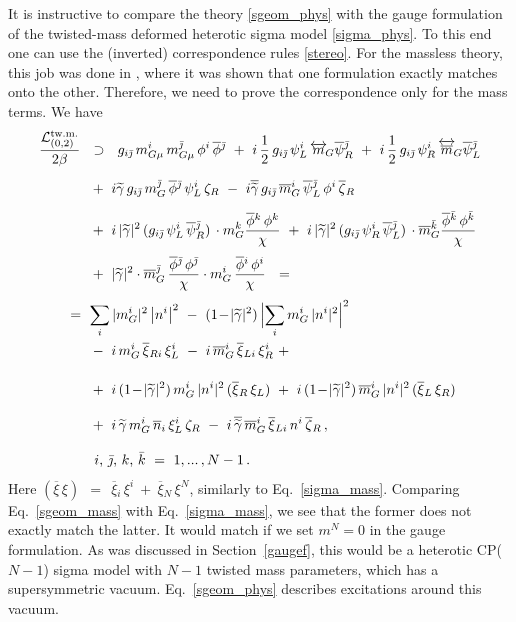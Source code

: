 \documentclass[12pt]{article}
\newcommand{\wt}{\widetilde}
\newcommand{\ov}{\overline}
\newcommand{\mc}[1]{\mathcal{#1}}
\newcommand{\bxir}{\ov{\xi}{}_R}
\newcommand{\bxil}{\ov{\xi}{}_L}
\newcommand{\xir}{\xi_R}
\newcommand{\xil}{\xi_L}
\newcommand{\bzr}{\ov{\zeta}{}_R}
\newcommand{\zr}{\zeta_R}
\newcommand{\tgamma}{\wt{\gamma}}
\newcommand{\btgamma}{\ov{\tgamma}}
\newcommand{\bpsi}{\ov{\psi}{}}
\newcommand{\bphi}{\ov{\phi}{}}
\newcommand{\bxi}{\ov{\xi}{}}
\newcommand{\bj}{{\bar \jmath}}
\newcommand{\bk}{{\bar k}}
\begin{document}
	It is instructive to compare the theory \eqref{sgeom_phys} with the gauge formulation of  the
	twisted-mass deformed heterotic sigma
	model  \eqref{sigma_phys}. To this end one
can use the (inverted) correspondence rules \eqref{stereo}. 
	For the massless theory, this job was done in \cite{BSYhet}, where it was shown that one formulation exactly
	matches onto the other.
	Therefore, we need to prove the correspondence only for the mass  terms.
	We have
\begin{align}
%
\notag
	\frac{\mc{L}_{(0,2)}^\text{tw.m.}}{2\beta} & ~~\supset~~ 
	g_{i\bj}\, m_{G\mu}^i\,m_{G\mu}^\bj\, \phi^i\, \bphi^\bj
	~+~ i\,\frac{1}{2}\,g_{i\bj}\,\psi_L^i\, \overleftrightarrow{m}{}_{\!G} \bpsi_R^\bj
	~+~ i\,\frac{1}{2}\,g_{i\bj}\,\psi_R^i\, \overleftrightarrow{\ov{m}}{}_{\!G} \bpsi_L^\bj
	\\[2mm]
%
\notag
	&~
	~+~ i\tgamma\, g_{i\bj}\, m_G^\bj\,\bphi^\bj\, \psi_L^i\,\zr
	~-~ i\btgamma\, g_{i\bj}\,\ov{m}{}_G^i\, \bpsi_L^\bj\, \phi^i\,\bzr
	\\[2mm]
%
\notag
	&~
	~+~ i\, |\tgamma|^2\, (g_{i\bj}\,\psi_L^i\,\bpsi_R^\bj)\, \cdot m_G^k \frac{\bphi^k\, \phi^k}{\chi}
	~+~ i\, |\tgamma|^2\, (g_{i\bj}\,\psi_R^i\,\bpsi_L^\bj)\, \cdot \ov{m}{}_G^\bk \frac{\bphi^\bk\,\phi^\bk}{\chi}
	\\[1mm]
%
\notag
	&~
	~+~ |\tgamma|^2 \cdot \ov{m}{}_G^\bj\,\frac{\bphi^\bj\,\phi^\bj}{\chi}
			\cdot m_G^i\, \frac{\bphi^i\, \phi^i}{\chi}
	~~=~~
	\\[1mm]
%
\label{sgeom_mass}
	&\!\!\!\!\!\!\!\!
	~=~
	\sum_i |m_G^i|^2 \left|n^i \right|^2 ~-~ (1 \!-\! |\tgamma|^2)\, \Bigl| \sum_i m_G^i\, |n^i|^2 \Bigr|^2 
	\\
%
\notag
	&~
	~-~ i\,m_G^i\,\bxi_{Ri}\,\xi_L^i 
	~-~ i\,\ov{m}{}_G^i\, \bxi_{Li}\, \xi_R^i ~+~
	\\[4mm]
%
\notag
	&~
	~+~ i\,(1\!-\!|\tgamma|^2)\, m_G^i\,|n^i|^2\, (\bxir\,\xil) 
	~+~ i\,(1\!-\!|\tgamma|^2)\, \ov{m}{}_G^i\,|n^i|^2\, (\bxil\,\xir)
	\\[3mm]
%
\notag
	&~
	~+~ i\,\tgamma\, m_G^i\,\ov{n}{}_i\, \xi_L^i\, \zr
	~-~ i\,\btgamma\, \ov{m}{}_G^i\, \bxi_{Li}\, n^i\, \bzr\,,
	\\[3mm]
%
\notag
	&~~~
	\text{$i$, $\bj$, $k$, $\bk$} ~=~ 1,...\,, N-1\,.
\end{align}
	Here 
$
	(\ov{\xi}\, \xi) ~~=~~ \ov{\xi}{}_i\, \xi^i  ~+~  \ov{\xi}{}_N\, \xi^N
$,
	similarly to Eq.~\eqref{sigma_mass}.
	Comparing Eq.~\eqref{sgeom_mass} with Eq.~\eqref{sigma_mass}, we   see that the former
	does not   exactly match   the latter.
	It would match if we set $ m^N = 0 $ in the gauge formulation.
	As was discussed in Section~\ref{gaugef}, this would be a heterotic CP($N-1$) sigma model
	with $ N-1 $ twisted mass parameters, which has a supersymmetric vacuum.
	Eq.~\eqref{sgeom_phys} describes excitations around this vacuum.
\end{document}
